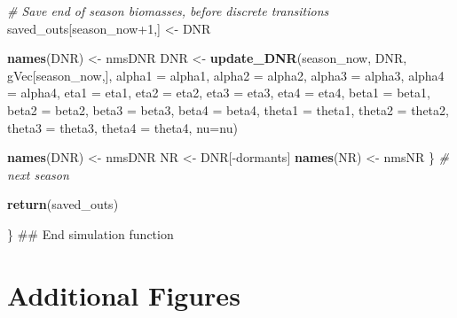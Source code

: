 \documentclass[11pt,]{article}
\newenvironment{Shaded}{\begin{snugshade}}{\end{snugshade}}
\newcommand{\KeywordTok}[1]{\textcolor[rgb]{0.13,0.29,0.53}{\textbf{{#1}}}}
\newcommand{\DataTypeTok}[1]{\textcolor[rgb]{0.13,0.29,0.53}{{#1}}}
\newcommand{\DecValTok}[1]{\textcolor[rgb]{0.00,0.00,0.81}{{#1}}}
\newcommand{\StringTok}[1]{\textcolor[rgb]{0.31,0.60,0.02}{{#1}}}
\newcommand{\CommentTok}[1]{\textcolor[rgb]{0.56,0.35,0.01}{\textit{{#1}}}}
\newcommand{\NormalTok}[1]{{#1}}
\begin{document}
\begin{Shaded}
\begin{Highlighting}[]
    \CommentTok{# Save end of season biomasses, before discrete transitions}
    \NormalTok{saved_outs[season_now}\DecValTok{+1}\NormalTok{,] <-}\StringTok{ }\NormalTok{DNR}
    
    \KeywordTok{names}\NormalTok{(DNR) <-}\StringTok{ }\NormalTok{nmsDNR}
    \NormalTok{DNR <-}\StringTok{ }\KeywordTok{update_DNR}\NormalTok{(season_now, DNR, gVec[season_now,],}
                      \DataTypeTok{alpha1 =} \NormalTok{alpha1, }\DataTypeTok{alpha2 =} \NormalTok{alpha2, }
                      \DataTypeTok{alpha3 =} \NormalTok{alpha3, }\DataTypeTok{alpha4 =} \NormalTok{alpha4,}
                      \DataTypeTok{eta1 =} \NormalTok{eta1, }\DataTypeTok{eta2 =} \NormalTok{eta2, }\DataTypeTok{eta3 =} \NormalTok{eta3, }\DataTypeTok{eta4 =} \NormalTok{eta4,}
                      \DataTypeTok{beta1 =} \NormalTok{beta1, }\DataTypeTok{beta2 =} \NormalTok{beta2, }
                      \DataTypeTok{beta3 =} \NormalTok{beta3, }\DataTypeTok{beta4 =} \NormalTok{beta4,}
                      \DataTypeTok{theta1 =} \NormalTok{theta1, }\DataTypeTok{theta2 =} \NormalTok{theta2, }
                      \DataTypeTok{theta3 =} \NormalTok{theta3, }\DataTypeTok{theta4 =} \NormalTok{theta4,}
                      \DataTypeTok{nu=}\NormalTok{nu)}
    
    \KeywordTok{names}\NormalTok{(DNR) <-}\StringTok{ }\NormalTok{nmsDNR}
    \NormalTok{NR         <-}\StringTok{ }\NormalTok{DNR[-dormants]  }
    \KeywordTok{names}\NormalTok{(NR)  <-}\StringTok{ }\NormalTok{nmsNR}
  \NormalTok{\} }\CommentTok{# next season}
  
  \KeywordTok{return}\NormalTok{(saved_outs)}
  
\NormalTok{\} ##  End simulation function}
\end{Highlighting}
\end{Shaded}

\newpage{}

\section{Additional Figures}
\end{document}
